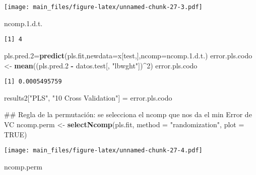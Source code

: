 \documentclass[]{article}
\newenvironment{Shaded}{\begin{snugshade}}{\end{snugshade}}
\newcommand{\KeywordTok}[1]{\textcolor[rgb]{0.13,0.29,0.53}{\textbf{#1}}}
\newcommand{\DataTypeTok}[1]{\textcolor[rgb]{0.13,0.29,0.53}{#1}}
\newcommand{\DecValTok}[1]{\textcolor[rgb]{0.00,0.00,0.81}{#1}}
\newcommand{\FloatTok}[1]{\textcolor[rgb]{0.00,0.00,0.81}{#1}}
\newcommand{\StringTok}[1]{\textcolor[rgb]{0.31,0.60,0.02}{#1}}
\newcommand{\OtherTok}[1]{\textcolor[rgb]{0.56,0.35,0.01}{#1}}
\newcommand{\OperatorTok}[1]{\textcolor[rgb]{0.81,0.36,0.00}{\textbf{#1}}}
\newcommand{\NormalTok}[1]{#1}
\begin{document}
\texttt{[image: main\_files/figure-latex/unnamed-chunk-27-3.pdf]}

\begin{Shaded}
\begin{Highlighting}[]
\NormalTok{ncomp.}\FloatTok{1.}\NormalTok{d.t.}
\end{Highlighting}
\end{Shaded}

\begin{verbatim}
[1] 4
\end{verbatim}

\begin{Shaded}
\begin{Highlighting}[]
\NormalTok{pls.pred.}\DecValTok{2}\NormalTok{=}\KeywordTok{predict}\NormalTok{(pls.fit,}\DataTypeTok{newdata=}\NormalTok{x[test,],}\DataTypeTok{ncomp=}\NormalTok{ncomp.}\FloatTok{1.}\NormalTok{d.t.)}
\NormalTok{error.pls.codo <-}\StringTok{ }\KeywordTok{mean}\NormalTok{((pls.pred.}\DecValTok{2} \OperatorTok{-}\StringTok{ }\NormalTok{datos.test[, }\StringTok{"lbwght"}\NormalTok{])}\OperatorTok{^}\DecValTok{2}\NormalTok{)}
\NormalTok{error.pls.codo}
\end{Highlighting}
\end{Shaded}

\begin{verbatim}
[1] 0.0005495759
\end{verbatim}

\begin{Shaded}
\begin{Highlighting}[]
\NormalTok{results2[}\StringTok{"PLS"}\NormalTok{, }\StringTok{"10 Cross Validation"}\NormalTok{] =}\StringTok{ }\NormalTok{error.pls.codo}

\NormalTok{## Regla de la permutación: se selecciona el ncomp que nos da el min Error de VC}
\NormalTok{ncomp.perm <-}\StringTok{ }\KeywordTok{selectNcomp}\NormalTok{(pls.fit, }\DataTypeTok{method =} \StringTok{"randomization"}\NormalTok{, }\DataTypeTok{plot =} \OtherTok{TRUE}\NormalTok{)}
\end{Highlighting}
\end{Shaded}

\texttt{[image: main\_files/figure-latex/unnamed-chunk-27-4.pdf]}

\begin{Shaded}
\begin{Highlighting}[]
\NormalTok{ncomp.perm}
\end{Highlighting}
\end{Shaded}
\end{document}
